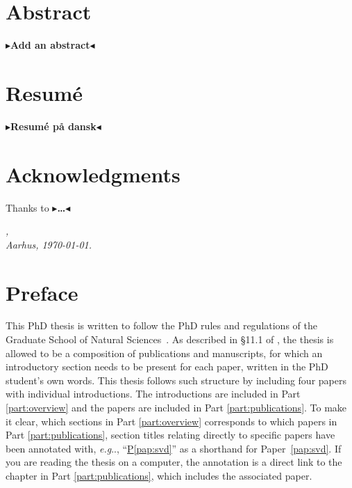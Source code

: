 \documentclass[11pt,a4paper,twoside,openright,final]{memoir}
\makeatletter
\def\ifdraft{\ifdim\overfullrule>\z@
  \expandafter\@firstoftwo\else\expandafter\@secondoftwo\fi}
\newcommand{\todo}[1]{{
    \ifdraft{
        \color[rgb]{.5,0,0}\textbf{
            $\blacktriangleright$#1$\blacktriangleleft$
         }
    }{}}}
\DeclareRobustCommand\onedot{\futurelet\@let@token\@onedot}
\def\@onedot{\ifx\@let@token.\else.\null\fi\xspace}
\def\eg{\emph{e.g}\onedot} \def\Eg{\emph{E.g}\onedot}
\newcommand\contribution[1]{\hspace{0.5em}\hyperref[#1]{P\ref{#1}}}
\newcommand*{\paperref}[1]{Paper~\hyperref[#1]{\ref{#1}}}
\makeatother
\begin{document}
\frontmatter
\cleardoublepage
\chapter*{{\Huge Abstract}}
\todo{Add an abstract}

\cleardoublepage
\chapter*{{\Huge Resum\'e}}

\todo{Resum\'e på dansk}

\cleardoublepage
\chapter*{{\Huge Acknowledgments}}

Thanks to \todo{\dots}

\vspace{2ex}
\begin{flushright}
  \makeatletter\emph{\theauthor,}\makeatother\\
  \emph{Aarhus, \today.}
\end{flushright}

\cleardoublepage
\chapter*{{\Huge Preface}}
This PhD thesis is written to follow the PhD rules and regulations of the Graduate School of Natural Sciences~\cite{au-regulations}. 
As described in \S 11.1 of \cite{au-regulations}, the thesis is allowed to be a composition of publications and manuscripts, for which an introductory section needs to be present for each paper, written in the PhD student's own words.
This thesis follows such structure by including four papers with individual introductions.
The introductions are included in Part \ref{part:overview} and the papers are included in Part \ref{part:publications}.
To make it clear, which sections in Part \ref{part:overview} corresponds to which papers in Part \ref{part:publications}, section titles relating directly to specific papers have been annotated with, \eg,  ``\hspace{-0.5em}\contribution{pap:svd}'' as a shorthand for \paperref{pap:svd}.
If you are reading the thesis on a computer, the annotation is a direct link to the chapter in Part \ref{part:publications}, which includes the associated paper.
\end{document}

